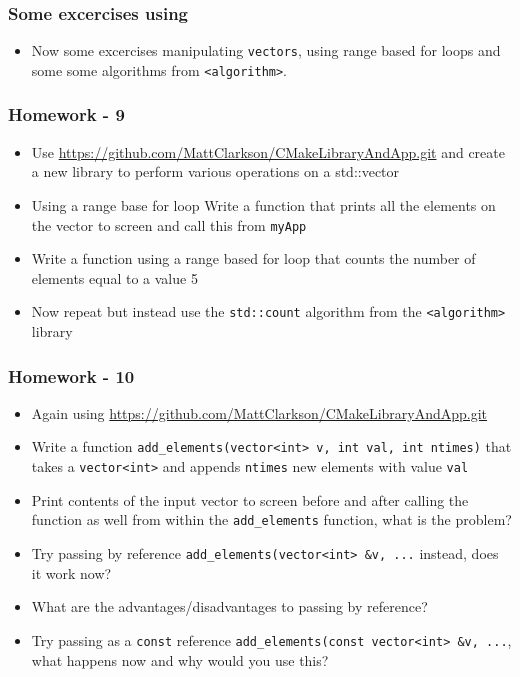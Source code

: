 \subsubsection{Some excercises using}\label{some-excercises-using}

\begin{itemize}
\itemsep1pt\parskip0pt
\item
  Now some excercises manipulating \texttt{vectors}, using range based
  for loops and some some algorithms from
  \texttt{\textless{}algorithm\textgreater{}}.
\end{itemize}

\subsubsection{Homework - 9}\label{homework---9}

\begin{itemize}
\itemsep1pt\parskip0pt
\item
  Use \url{https://github.com/MattClarkson/CMakeLibraryAndApp.git} and
  create a new library to perform various operations on a std::vector
\item
  Using a range base for loop Write a function that prints all the
  elements on the vector to screen and call this from \texttt{myApp}
\item
  Write a function using a range based for loop that counts the number
  of elements equal to a value 5
\item
  Now repeat but instead use the \texttt{std::count} algorithm from the
  \texttt{\textless{}algorithm\textgreater{}} library
\end{itemize}

\subsubsection{Homework - 10}\label{homework---10}

\begin{itemize}
\itemsep1pt\parskip0pt
\item
  Again using
  \url{https://github.com/MattClarkson/CMakeLibraryAndApp.git}
\item
  Write a function
  \texttt{add\_elements(vector\textless{}int\textgreater{} v, int val, int ntimes)}
  that takes a \texttt{vector\textless{}int\textgreater{}} and appends
  \texttt{ntimes} new elements with value \texttt{val}\\
\item
  Print contents of the input vector to screen before and after calling
  the function as well from within the \texttt{add\_elements} function,
  what is the problem?
\item
  Try passing by reference
  \texttt{add\_elements(vector\textless{}int\textgreater{} \&v, ...}
  instead, does it work now?
\item
  What are the advantages/disadvantages to passing by reference?
\item
  Try passing as a \texttt{const} reference
  \texttt{add\_elements(const vector\textless{}int\textgreater{} \&v, ...},
  what happens now and why would you use this?
\end{itemize}

